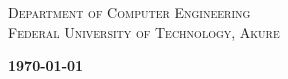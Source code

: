 \begin{titlepage}
\begin{center}
	\textsc{Department of Computer Engineering\\
		Federal University of Technology, Akure}
\end{center}

\vfill
\begin{flushright}
	\bf{{\today}}
\end{flushright}

\end{titlepage}
